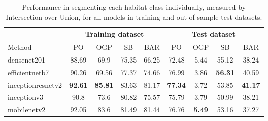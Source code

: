 \begin{table}[H]
    \centering
    \caption{Performance in segmenting each habitat class individually,
        measured by Intersection over Union, for all models in training and
        out-of-sample test datasets.}
    \label{tab:metrics_classes}
    \begin{tabular}{lcccc|cccc}
        \toprule
                            & \multicolumn{4}{c}{Training dataset} &
        \multicolumn{4}{|c}{Test
            dataset}

        \\
        \midrule
        Method              & PO                                   & OGP
                            & SB                                   & BAR
                            & PO                                   & OGP
                            & SB
                            & BAR

        \\
        \midrule
        densenet201         & 88.69                                & 69.9
                            & 75.35                                & 66.25
                            & 72.48                                & 5.44
                            &
        55.12               & 38.24

        \\
        efficientnetb7      & 90.26                                & 69.56
                            & 77.37                                & 74.66
                            & 76.99                                & 3.86
                            &
        \textbf{56.31}      & 40.59

        \\
        inceptionresnetv2   & \textbf{92.61}                       &
        \textbf{85.81}      & 83.63                                & 81.17
                            &
        \textbf{77.34}      & 3.72                                 & 53.85
                            & \textbf{41.17}
        \\
        inceptionv3         & 90.8                                 & 73.6
                            & 80.82                                & 75.57
                            & 75.79                                & 3.79
                            &
        50.99               & 38.21

        \\
        mobilenetv2         & 92.05                                & 83.6
                            & 81.49                                & 81.44
                            & 76.76                                &
        \textbf{5.49}       & 53.16                                & 37.27


\end{tabular}
\end{table}
